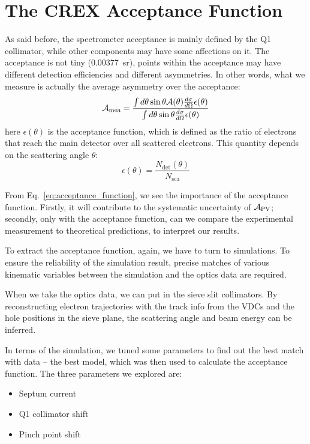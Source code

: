 \section{The CREX Acceptance Function}
As said before, the spectrometer acceptance is mainly defined by the Q1 
collimator, while other components may have some affections on it. The acceptance
is not tiny (0.00377~sr), points within the acceptance may have
different detection efficiencies and different asymmetries. In other words, 
what we measure is actually the average asymmetry over the acceptance:
\begin{equation}
    \mathcal{A}_{\text{mea}} = \frac{\int d\theta \sin\theta \mathcal{A}(\theta) \frac{d\sigma}{d\Omega} \epsilon(\theta)}{\int d\theta \sin\theta \frac{d\sigma}{d\Omega} \epsilon(\theta)}
    \label{eq:acceptance_function}
\end{equation}
here $\epsilon(\theta)$ is the acceptance function, which is defined as
the ratio of electrons that reach the main detector over all scattered
electrons. This quantity depends on the scattering angle $\theta$:
\begin{equation}
    \epsilon(\theta) = \frac{N_{\text{det}}(\theta)}{N_{\text{sca}}}
    \label{eq:acceptance_definition}
\end{equation}

From Eq.~\ref{eq:acceptance_function}, we see the importance of the acceptance
function. Firstly, it will contribute to the systematic uncertainty of $\mathcal{A}_{\text{PV}}$;
secondly, only with the acceptance function, can we compare
the experimental measurement to theoretical predictions, to interpret our
results.

To extract the acceptance function, again, we have to turn to simulations. 
To ensure the reliability of the simulation result, precise matches of 
various kinematic variables between the simulation and the optics data are required. 

When we take the optics data, we can put in the sieve slit collimators.
By reconstructing electron trajectories with the track info from the VDCs 
and the hole positions in the sieve plane, the scattering angle and beam energy
can be inferred.

In terms of the simulation, we tuned some parameters to find out the best
match with data -- the best model, which was then used to calculate the acceptance
function. The three parameters we explored are:
\begin{itemize}
    \item Septum current
    \item Q1 collimator shift
    \item Pinch point shift
\end{itemize}

